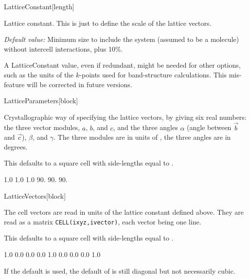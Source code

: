 \begin{fdfentry}{LatticeConstant}[length]

  Lattice constant. This is just to define the scale of the lattice
  vectors.

  \textit{Default value:} Minimum size to include the system (assumed
  to be a molecule) without intercell interactions, plus 10\%.

  \note A LatticeConstant value, even if redundant, might be needed
  for other options, such as the units of the $k$-points used for
  band-structure calculations. This mis-feature will be corrected in
  future versions.
  
\end{fdfentry}

\begin{fdfentry}{LatticeParameters}[block]

  Crystallographic way of specifying the lattice vectors, by giving
  six real numbers: the three vector modules, $a$, $b$, and $c$, and
  the three angles $\alpha$ (angle between $\vec b$ and $\vec c$),
  $\beta$, and $\gamma$. The three modules are in units of
  , the three angles are in degrees.

  This defaults to a square cell with side-lengths equal to .
  \begin{fdfexample}
    1.0  1.0  1.0   90.  90.  90.
  \end{fdfexample}
  
\end{fdfentry}

\begin{fdfentry}{LatticeVectors}[block]

  The cell vectors are read in units of the lattice constant defined
  above.  They are read as a matrix \texttt{CELL(ixyz,ivector)}, each
  vector being one line.

  This defaults to a square cell with side-lengths equal to .
  \begin{fdfexample}
    1.0  0.0  0.0
    0.0  1.0  0.0
    0.0  0.0  1.0
  \end{fdfexample}

  \noindent
  If the  default is used, the default of
   is still diagonal but not necessarily cubic.
  
\end{fdfentry}

